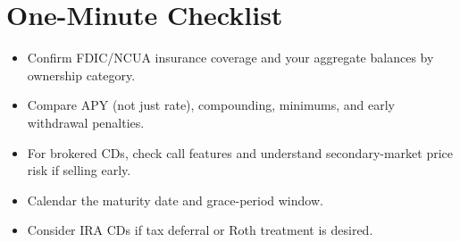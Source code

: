 \documentclass[11pt]{article}
\begin{document}
\section*{One-Minute Checklist}
\begin{itemize}
  \item Confirm FDIC/NCUA insurance coverage and your aggregate balances by ownership category.
  \item Compare APY (not just rate), compounding, minimums, and early withdrawal penalties.
  \item For brokered CDs, check call features and understand secondary-market price risk if selling early.
  \item Calendar the maturity date and grace-period window.
  \item Consider IRA CDs if tax deferral or Roth treatment is desired.
\end{itemize}
\end{document}
